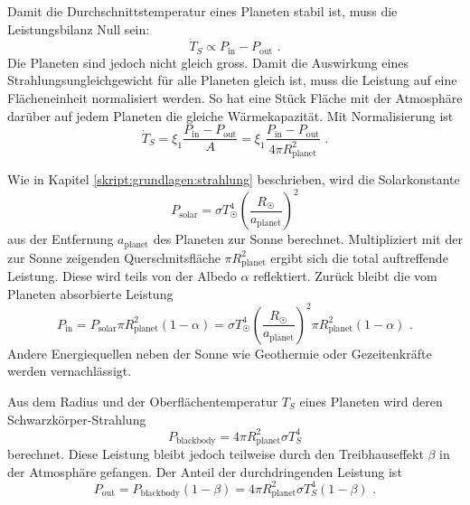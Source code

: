 \begin{refsection}
Damit die Durchschnittstemperatur eines Planeten stabil ist, muss die Leistungsbilanz Null sein:
\begin{equation}
\dot{T}_S \propto P_{\text{in}} - P_{\text{out}}\text{ .}
\end{equation}
Die Planeten sind jedoch nicht gleich gross. Damit die Auswirkung eines Strahlungsungleichgewicht für alle Planeten gleich ist, muss die Leistung auf eine Flächeneinheit normalisiert werden. So hat eine Stück Fläche mit der Atmosphäre darüber auf jedem Planeten die gleiche Wärmekapazität. Mit Normalisierung ist
\begin{equation}
\dot{T}_S = \xi_1 \frac{P_{\text{in}} - P_{\text{out}}}{A} = \xi_1 \frac{P_{\text{in}} - P_{\text{out}}}{4 \pi R_{\text{planet}}^2}\text{ .}
\end{equation}

Wie in Kapitel \ref{skript:grundlagen:strahlung} beschrieben, wird die Solarkonstante
\begin{equation}
P_{\text{solar}} = \sigma T_{\astrosun}^4 \left( \frac{R_{\astrosun}}{a_{\text{planet}}} \right) ^2
\end{equation}
aus der Entfernung $a_{\text{planet}}$ des Planeten zur Sonne berechnet. Multipliziert mit der zur Sonne zeigenden Querschnitsfläche $\pi R_{\text{planet}}^2$ ergibt sich die total auftreffende Leistung. Diese wird teils von der Albedo $\alpha$ reflektiert. Zurück bleibt die vom Planeten absorbierte Leistung \begin{equation}
P_{\text{in}} = P_{\text{solar}}  \pi R_{\text{planet}}^2 (1-\alpha) = \sigma T_{\astrosun}^4 \left( \frac{R_{\astrosun}}{a_{\text{planet}}} \right) ^2 \pi R_{\text{planet}}^2 (1-\alpha)\text{ .}
\end{equation}
Andere Energiequellen neben der Sonne wie Geothermie oder Gezeitenkräfte werden vernachlässigt.

Aus dem Radius und der Oberflächentemperatur $T_{S}$ eines Planeten wird deren Schwarzkörper-Strahlung \begin{equation}
P_{\text{blackbody}} = 4 \pi R_{\text{planet}}^2 \sigma T_{S}^4
\end{equation}
berechnet. Diese Leistung bleibt jedoch teilweise durch den Treibhauseffekt $\beta$ in der Atmosphäre gefangen. Der Anteil der durchdringenden Leistung ist
\begin{equation}
P_{\text{out}} = P_{\text{blackbody}} (1 - \beta) = 4 \pi R_{\text{planet}}^2 \sigma T_{S}^4 (1 - \beta)\text{ .}
\end{equation}


\end{refsection}
